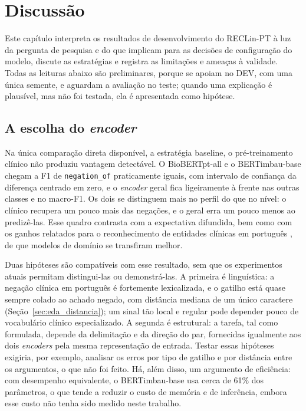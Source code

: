 \chapter[Discussão]{Discussão}
\label{cap:discussao}

Este capítulo interpreta os resultados de desenvolvimento do RECLin-PT à luz da
pergunta de pesquisa e do que implicam para as decisões de configuração do modelo,
discute as estratégias e registra as limitações e ameaças à validade. Todas as leituras abaixo são preliminares, porque se apoiam no DEV, com uma
única semente, e aguardam a avaliação no teste; quando uma explicação é plausível,
mas não foi testada, ela é apresentada como hipótese.

\section{A escolha do \emph{encoder}}
\label{sec:discussao_encoder}

Na única comparação direta disponível, a estratégia baseline, o pré-treinamento
clínico não produziu vantagem detectável. O BioBERTpt-all e o BERTimbau-base
chegam a F1 de \texttt{negation\_of} praticamente iguais, com intervalo de confiança
da diferença centrado em zero, e o \emph{encoder} geral fica ligeiramente à frente
nas outras classes e no macro-F1. Os dois se distinguem mais no perfil do que no
nível: o clínico recupera um pouco mais das negações, e o geral erra um pouco menos
ao predizê-las. Esse quadro contrasta com a expectativa difundida, bem como com os
ganhos relatados para o reconhecimento de entidades clínicas em português
\cite{schneider_2020_biobertpt}, de que modelos de domínio se transfiram melhor.

Duas hipóteses são compatíveis com esse resultado, sem que os experimentos atuais
permitam distingui-las ou demonstrá-las. A primeira é linguística: a negação clínica
em português é fortemente lexicalizada, e o gatilho está quase sempre colado ao achado
negado, com distância mediana de um único caractere (Seção~\ref{sec:eda_distancia});
um sinal tão local e regular pode depender pouco de vocabulário clínico
especializado. A segunda é estrutural: a tarefa, tal como formulada, depende da
delimitação e da direção do par, fornecidas igualmente aos dois \emph{encoders} pela
mesma representação de entrada. Testar essas hipóteses exigiria, por exemplo, analisar
os erros por tipo de gatilho e por distância entre os argumentos, o que não foi feito.
Há, além disso, um argumento de eficiência: com desempenho equivalente, o
BERTimbau-base usa cerca de 61\% dos parâmetros, o que tende a reduzir o custo de
memória e de inferência, embora esse custo não tenha sido medido neste trabalho.

